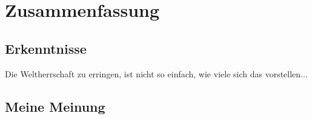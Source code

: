 \chapter{Zusammenfassung} 
\label{kap-zusammenfassung}%

\section{Erkenntnisse}

Die Weltherrschaft zu erringen, ist nicht so einfach, wie viele sich das vorstellen...

\section{Meine Meinung}